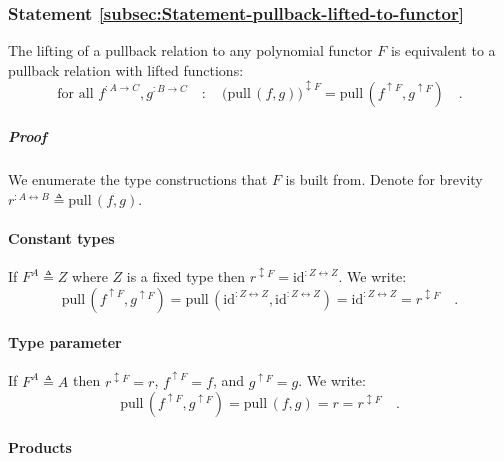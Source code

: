 \subsubsection{Statement \label{subsec:Statement-pullback-lifted-to-functor}\ref{subsec:Statement-pullback-lifted-to-functor}}

The lifting of a pullback relation to any polynomial functor $F$
is equivalent to a pullback relation with lifted functions:
\[
\text{for all }f^{:A\rightarrow C},g^{:B\rightarrow C}\quad:\quad\big(\text{pull}\,(f,g)\big)^{\updownarrow F}=\text{pull}\,(f^{\uparrow F},g^{\uparrow F})\quad.
\]


\subparagraph{Proof}

\begin{comment}
Most likely this is wrong for non-polynomial (although covariant)
functors $F$
\end{comment}
We enumerate the type constructions that $F$ is built from. Denote
for brevity $r^{:A\leftrightarrow B}\triangleq\text{pull}\,(f,g)$.

\paragraph{Constant types}

If $F^{A}\triangleq Z$ where $Z$ is a fixed type then $r^{\updownarrow F}=\text{id}^{:Z\leftrightarrow Z}$.
We write:
\[
\text{pull}\,(f^{\uparrow F},g^{\uparrow F})=\text{pull}\,(\text{id}^{:Z\leftrightarrow Z},\text{id}^{:Z\leftrightarrow Z})=\text{id}^{:Z\leftrightarrow Z}=r^{\updownarrow F}\quad.
\]


\paragraph{Type parameter}

If $F^{A}\triangleq A$ then $r^{\updownarrow F}=r$, $f^{\uparrow F}=f$,
and $g^{\uparrow F}=g$. We write:
\[
\text{pull}\,(f^{\uparrow F},g^{\uparrow F})=\text{pull}\,(f,g)=r=r^{\updownarrow F}\quad.
\]


\paragraph{Products}

